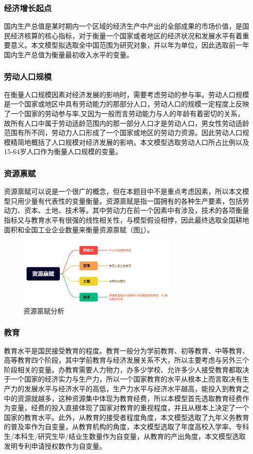 \documentclass[UTF8]{article}
\begin{document}
	\subsubsection{经济增长起点}
	国内生产总值是某时期内一个区域的经济生产中产出的全部成果的市场价值，是国民经济核算的核心指标，对于衡量一个国家或者地区的经济状况和发展水平有着重要意义。本文模型拟选取全中国范围为研究对象，并以年为单位，因此选取前一年国内生产总值为衡量最初收入水平的变量。
	\subsubsection{劳动人口规模}
	在衡量人口规模因素对经济发展的影响时，需要考虑劳动的参与率。劳动人口规模是一个国家或地区中具有劳动能力的那部分人口，劳动人口的规模一定程度上反映了一个国家的劳动参与率\cite{ldrk},又因为一般而言劳动能力与人的年龄有着密切的关系，故所有人口中属于劳动适龄范围内的那一部分人口才是劳动人口，男女性劳动适龄范围有所不同，劳动力人口形成了一个国家或地区的劳动力资源。因此劳动人口规模精简地概括了人口规模对经济发展的影响，本文模型选取劳动人口所占比例以及15-64岁人口作为衡量人口规模的变量。
	\subsubsection{资源禀赋}
	资源禀赋可以说是一个很广的概念，但在本题目中不是重点考虑因素，所以本文模型只用少量有代表性的变量衡量。资源禀赋是指一国拥有的各种生产要素，包括劳动力、资本、土地、技术等\cite{caten}。其中劳动力在前一个因素中有涉及，技术的各项衡量指标又与教育水平有很强的线性相关性，与模型假设相悖，因此最终选取全国耕地面积和全国工业企业数量来衡量资源禀赋（图\ref{zybf}）。
    	\begin{figure}[htb]
    	\centering
    	\includegraphics[width=8cm]{pictures/zybf.png}
    	\caption{资源禀赋分析}
    	\label{zybf}
    	\end{figure}
	\subsubsection{教育}
	教育水平是国民接受教育的程度。教育一般分为学前教育、初等教育、中等教育、高等教育四个阶段，其中学前教育与经济发展关系不大，所以主要考虑与另外三个阶段相关的变量。办教育需要人力物力，办多少学校、允许多少人接受教育都取决于一个国家的经济实力与生产力，所以一个国家教育的水平从根本上而言取决有生产力的发展水平与经济水平的高低，生产力水平与经济水平越高，能投入到教育之中的资源就越多，这种资源集中体现为教育经费，所以本模型首先选取教育经费作为变量，经费的投入直接体现了国家对教育的重视程度，并且从根本上决定了一个国家的教育水平。此外，从教育的接受者程度角度，本文模型选取了九年义务教育的普及率作为自变量，从教育机构的角度，本文模型选取了年度高校入学率、专科生/本科生/研究生毕/结业生数量作为自变量，从教育的产出角度，本文模型选取发明专利申请授权数作为自变量。
\end{document}
